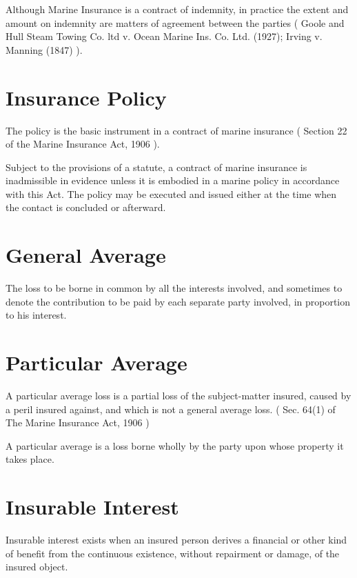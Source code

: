
Although Marine Insurance is a contract of indemnity, in practice the extent and amount on indemnity are matters of agreement between the parties ( Goole and Hull Steam Towing Co. ltd v. Ocean Marine Ins. Co. Ltd. (1927); Irving v. Manning (1847) ). 

\section{Insurance Policy}

The policy is the basic instrument in a contract of marine insurance ( Section 22 of the Marine Insurance Act, 1906 ).

Subject to the provisions of a statute, a contract of marine insurance is inadmissible in evidence unless it is embodied in a marine policy in accordance with this Act. The policy may be executed and issued either at the time when the contact is concluded or afterward. 

\section{General Average}

The loss to be  borne in common by all the interests involved, and sometimes to denote the contribution to be paid by each separate party involved, in proportion to his interest.

\section{Particular Average}

A particular average loss is a partial loss of the subject-matter insured, caused by a peril insured against, and which is not a general average loss. ( Sec. 64(1) of The Marine Insurance Act, 1906 )

A particular average is a loss borne wholly by the party upon whose property it takes place.

\section{Insurable Interest}

Insurable interest exists when an insured person derives a financial or other kind of benefit from the continuous existence, without repairment or damage, of the insured object.

